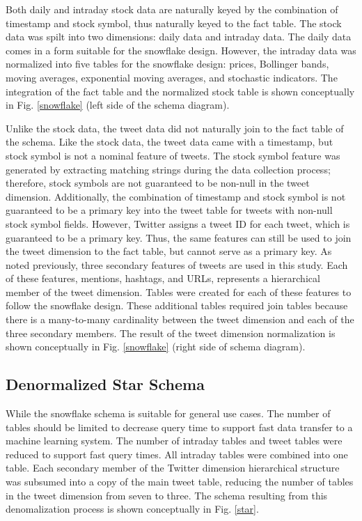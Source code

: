 \documentclass[journal]{IEEEtran}
\begin{document}
	Both daily and intraday stock data are naturally keyed by the
	combination of timestamp and stock symbol,
	thus naturally keyed to the fact table.
	The stock data was spilt into two dimensions: daily data and intraday data.
	The daily data comes in a form suitable for the snowflake design.
	However, the intraday data was normalized into five tables for the 
	snowflake design: prices, Bollinger bands, moving averages, exponential
	moving averages, and stochastic indicators.
	The integration of the fact table and the normalized stock table is shown
	conceptually in Fig. \ref{snowflake} (left side of the schema diagram).
	
	Unlike the stock data, the tweet data did not naturally join to the fact
	table of the schema.
	Like the stock data, the tweet data came with a timestamp, but stock symbol
	is not a nominal feature of tweets.
	The stock symbol feature was generated by extracting matching strings
	during the data collection process; therefore, stock symbols are not
	guaranteed to be non-null in the tweet dimension.
	Additionally, the combination of timestamp and stock symbol is not guaranteed
	to be a primary key into the tweet table for tweets with non-null stock symbol
	fields.
	However, Twitter assigns a tweet ID for each tweet, which is guaranteed to be
	a primary key.
	Thus, the same features can still be used to join the tweet dimension to the 
	fact table, but cannot serve as a primary key.
	As noted previously, three secondary features of tweets are used in this study.
	Each of these features, mentions, hashtags, and URLs, represents a hierarchical
	member of the tweet dimension.
	Tables were created for each of these features to follow the snowflake design.
	These additional tables required join tables because there is a many-to-many
	cardinality between the tweet dimension and each of the three secondary members.
	The result of the tweet dimension normalization is shown conceptually
	in Fig. \ref{snowflake} (right side of schema diagram).
	
	\subsection{Denormalized Star Schema}
	
	While the snowflake schema is suitable for general use cases.
	The number of tables should be limited to decrease query time to support
	fast data transfer to a machine learning system.
	The number of intraday tables and tweet tables were reduced to support
	fast query times.
	All intraday tables were combined into one table. 
	Each secondary member of the Twitter dimension hierarchical structure was
	subsumed into a copy of the main tweet table, reducing the number of tables
	in the tweet dimension from seven to three.
	The schema resulting from this denomalization process is shown
	conceptually in Fig. \ref{star}.
	
\end{document}
